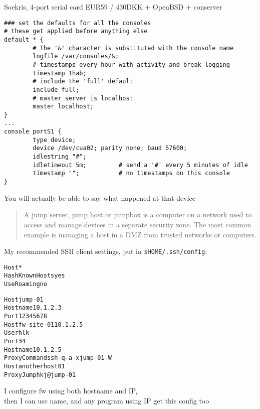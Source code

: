 \documentclass[Screen16to9,17pt]{foils}
\begin{document}


\centerline{Soekris, 4-port serial card EUR59 / 430DKK + OpenBSD + conserver}

\footnotesize
\begin{verbatim}
### set the defaults for all the consoles
# these get applied before anything else
default * {
        # The '&' character is substituted with the console name
        logfile /var/consoles/&;
        # timestamps every hour with activity and break logging
        timestamp 1hab;
        # include the 'full' default
        include full;
        # master server is localhost
        master localhost;
}
...
console portS1 {
        type device;
        device /dev/cua02; parity none; baud 57600;
        idlestring "#";
        idletimeout 5m;         # send a '#' every 5 minutes of idle
        timestamp "";           # no timestamps on this console
}
\end{verbatim}
\normalsize

\centerline{You will actually be able to say what happened at that device}




\begin{quote}
A jump server, jump host or jumpbox is a computer on a network used to access and manage devices in a separate security zone. The most common example is managing a host in a DMZ from trusted networks or computers.
\end{quote}




My recommended SSH client settings, put in \verb+$HOME/.ssh/config+:
\begin{alltt}\scriptsize
Host *
    HashKnownHosts yes
    UseRoaming no

Host jump-01
  Hostname 10.1.2.3
  Port 12345678
Host fw-site-01 10.1.2.5
  User hlk
  Port 34
  Hostname 10.1.2.5
  ProxyCommand ssh -q -a -x jump-01 -W %h:%p
Host anotherhost01
  ProxyJump hkj@jump-01
\end{alltt}

I configure fw using both hostname and IP,\\
then I can use name, and any program using IP get this config too
\end{document}
